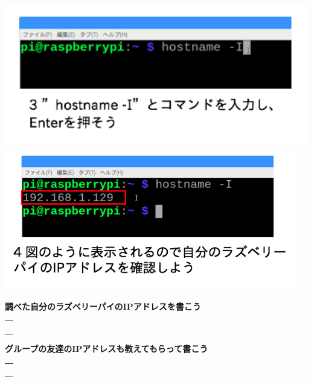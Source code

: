 \documentclass[a4paper,12pt,dvipdfmx]{jarticle}
\begin{document}
\includegraphics[width=13.799cm]{ome7-img010.png}
\centering
\includegraphics[width=12.771cm]{ome7-img009.png}
\flushleft


\bigskip


\bigskip


\bigskip


\bigskip


\bigskip

{\bfseries
	調べた自分のラズベリーパイのIPアドレスを書こう}

\bigskip


\centering
\begin{tabular}{|p{}|} \hline
	\\
	\\
	\\
	\\ \hline
\end{tabular}


\bigskip


\bigskip

\flushleft

{\bfseries
	グループの友達のIPアドレスも教えてもらって書こう}

\bigskip


\centering
\begin{tabular}{|p{}|} \hline
	\\
	\\
	\\
	\\ \hline
\end{tabular}
\end{document}
